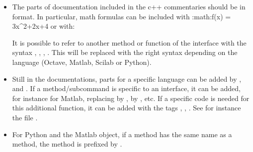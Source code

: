 \documentclass[a4paper,11pt,english]{sphinxmanual}
\begin{document}
\begin{itemize}
\item {} 
The parts of documentation included in the c++ commentaries should be in
 format. In particular, math formulas can be included
with :math:\textasciigrave{}f(x) = 3x\textasciicircum{}2+2x+4\textasciigrave{} or with:

\begin{sphinxVerbatim}[commandchars=\\\{\}]
 

    
\end{sphinxVerbatim}

It is possible to refer to another method or function of the interface
with the syntax ,
, ,
. This will be replaced with
the right syntax depending on the language (Octave, Matlab, Scilab or Python).

\item {} 
Still in the documentations, parts for a specific language can be added by
,  and
.
If a method/sub\sphinxhyphen{}command is specific to an interface, it can be added,
for instance for Matlab,
replacing  by ,  by , etc.
If a specific code is needed for this additional function, it can be added
with the tags , , . See
for instance the file .

\item {} 
For Python and the Matlab object, if a  method has the same name as
a  method, the  method is prefixed by .

\end{itemize}
\end{document}
